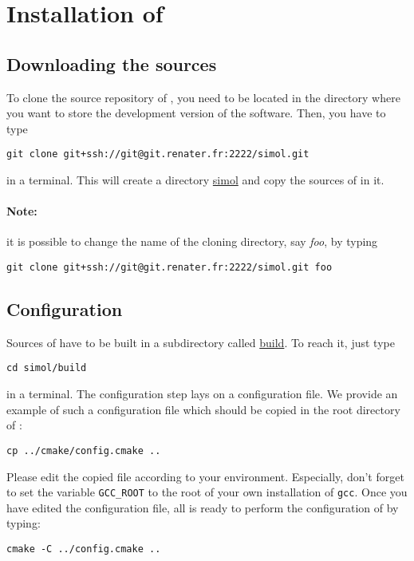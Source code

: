 \section{Installation of \Simol}

\subsection{Downloading the sources}

To clone the source repository of \Simol, you need to be located in the directory where you want to store the development version of the software. Then, you have to type
\begin{verbatim}
git clone git+ssh://git@git.renater.fr:2222/simol.git
\end{verbatim}
in a terminal. This will create a directory \url{simol} and copy the sources of \Simol in it. 

\paragraph{Note:}
it is possible to change the name of the cloning directory, say \textit{foo}, by typing 
\begin{verbatim}
git clone git+ssh://git@git.renater.fr:2222/simol.git foo
\end{verbatim}




\subsection{Configuration}

Sources of \Simol have to be built in a subdirectory called \url{build}. To reach it, just type
\begin{verbatim}
cd simol/build
\end{verbatim}
in a terminal. The configuration step lays on a configuration file. We provide an example of such a configuration file which should be copied in the root directory of \Simol :
\begin{verbatim}
cp ../cmake/config.cmake ..
\end{verbatim}
Please edit the copied file according to your environment. Especially, don't forget to set the variable \texttt{GCC\_ROOT} to the root of your own installation of \texttt{gcc}. Once you have edited the configuration file, all is ready to perform the configuration of \Simol by typing:
\begin{verbatim}
cmake -C ../config.cmake ..
\end{verbatim}

